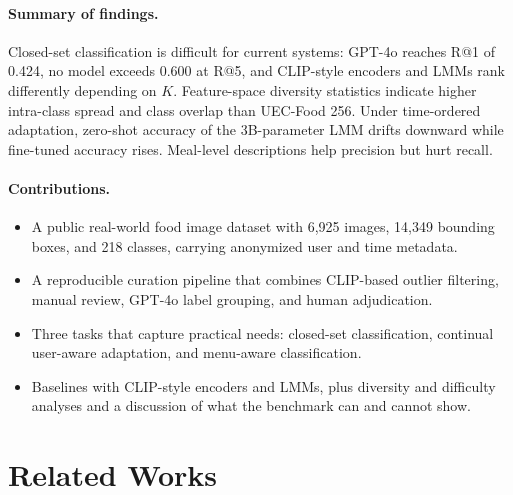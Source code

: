 \documentclass[sigconf, nonacm]{acmart}
\begin{document}
\paragraph{Summary of findings.} Closed-set classification is difficult for current systems: GPT-4o reaches R@1 of 0.424, no model exceeds 0.600 at R@5, and CLIP-style encoders and LMMs rank differently depending on $K$. Feature-space diversity statistics indicate higher intra-class spread and class overlap than UEC-Food 256. Under time-ordered adaptation, zero-shot accuracy of the 3B-parameter LMM drifts downward while fine-tuned accuracy rises. Meal-level descriptions help precision but hurt recall.

\paragraph{Contributions.}
\begin{itemize}[leftmargin=1.2em,itemsep=0pt,topsep=2pt]
  \item A public real-world food image dataset with 6,925 images, 14,349 bounding boxes, and 218 classes, carrying anonymized user and time metadata.
  \item A reproducible curation pipeline that combines CLIP-based outlier filtering, manual review, GPT-4o label grouping, and human adjudication.
  \item Three tasks that capture practical needs: closed-set classification, continual user-aware adaptation, and menu-aware classification.
  \item Baselines with CLIP-style encoders and LMMs, plus diversity and difficulty analyses and a discussion of what the benchmark can and cannot show.
\end{itemize}

\section{Related Works}
\end{document}
